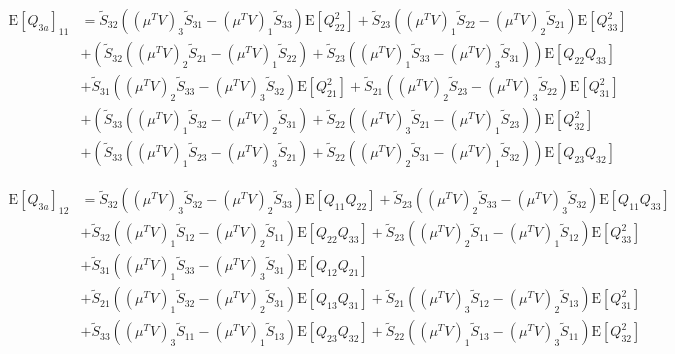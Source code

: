 \documentclass[10pt]{article}
\newcommand{\expect}[1]{\ensuremath{\mathrm{E}\left[ #1 \right]}}
\begin{document}
\begin{align}
	\expect{Q_{3a}}_{11} &= \tilde{S}_{32}\left( (\mu^TV)_3\tilde{S}_{31}-(\mu^TV)_1\tilde{S}_{33} \right)\expect{Q_{22}^2} + \tilde{S}_{23}\left( (\mu^TV)_1\tilde{S}_{22}-(\mu^TV)_2\tilde{S}_{21} \right)\expect{Q_{33}^2} \nonumber \\
	&+ \left( \tilde{S}_{32}\left( (\mu^TV)_2\tilde{S}_{21}-(\mu^TV)_1\tilde{S}_{22} \right) + \tilde{S}_{23}\left( (\mu^TV)_1\tilde{S}_{33}-(\mu^TV)_3\tilde{S}_{31} \right) \right)\expect{Q_{22}Q_{33}} \nonumber \\
	&+ \tilde{S}_{31}\left( (\mu^TV)_2\tilde{S}_{33}-(\mu^TV)_3\tilde{S}_{32} \right)\expect{Q_{21}^2} + \tilde{S}_{21}\left( (\mu^TV)_2\tilde{S}_{23}-(\mu^TV)_3\tilde{S}_{22} \right)\expect{Q_{31}^2} \nonumber \\
	&+ \left( \tilde{S}_{33}\left( (\mu^TV)_1\tilde{S}_{32}-(\mu^TV)_2\tilde{S}_{31} \right) + \tilde{S}_{22}\left( (\mu^TV)_3\tilde{S}_{21}-(\mu^TV)_1\tilde{S}_{23} \right) \right)\expect{Q_{32}^2} \nonumber \\
	&+ \left( \tilde{S}_{33}\left( (\mu^TV)_1\tilde{S}_{23}-(\mu^TV)_3\tilde{S}_{21} \right) + \tilde{S}_{22}\left( (\mu^TV)_2\tilde{S}_{31}-(\mu^TV)_1\tilde{S}_{32} \right) \right)\expect{Q_{23}Q_{32}}
\end{align}

\begin{align}
	\expect{Q_{3a}}_{12} &= \tilde{S}_{32}\left( (\mu^TV)_3\tilde{S}_{32}-(\mu^TV)_2\tilde{S}_{33} \right)\expect{Q_{11}Q_{22}} + \tilde{S}_{23}\left( (\mu^TV)_2\tilde{S}_{33}-(\mu^TV)_3\tilde{S}_{32} \right)\expect{Q_{11}Q_{33}} \nonumber \\
	&+ \tilde{S}_{32}\left( (\mu^TV)_1\tilde{S}_{12}-(\mu^TV)_2\tilde{S}_{11} \right)\expect{Q_{22}Q_{33}} + \tilde{S}_{23}\left( (\mu^TV)_2\tilde{S}_{11}-(\mu^TV)_1\tilde{S}_{12} \right)\expect{Q_{33}^2} \nonumber \\
	&+ \tilde{S}_{31}\left( (\mu^TV)_1\tilde{S}_{33}-(\mu^TV)_3\tilde{S}_{31} \right)\expect{Q_{12}Q_{21}} \nonumber \\
	&+ \tilde{S}_{21}\left( (\mu^TV)_{1}\tilde{S}_{32}-(\mu^TV)_{2}\tilde{S}_{31} \right)\expect{Q_{13}Q_{31}} + \tilde{S}_{21}\left( (\mu^TV)_3\tilde{S}_{12}-(\mu^TV)_2\tilde{S}_{13} \right)\expect{Q_{31}^2} \nonumber \\
	&+ \tilde{S}_{33}\left( (\mu^TV)_3\tilde{S}_{11}-(\mu^TV)_1\tilde{S}_{13} \right)\expect{Q_{23}Q_{32}} + \tilde{S}_{22}\left( (\mu^TV)_1\tilde{S}_{13}-(\mu^TV)_3\tilde{S}_{11} \right)\expect{Q_{32}^2}
\end{align}
\end{document}
